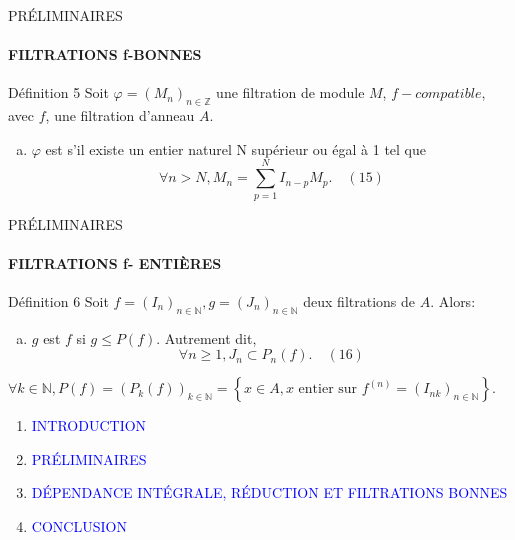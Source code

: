 \documentclass[11pt,a4paper]{beamer}
\begin{document}
	\begin{frame}{PRÉLIMINAIRES}
		\framesubtitle{FILTRATIONS f-BONNES}
		\begin{block}{Définition 5}
			Soit $\varphi=(M_n)_{n \in \mathbb{Z}}$ une filtration de module $M$, $f-compatible$, avec $f$, une filtration d'anneau $A$.
			\begin{enumerate}[(a)]
				\item $\varphi$ est  s'il existe un entier naturel N supérieur ou égal à 1 tel que
				\[\forall n > N, M_{n}=\sum_{p=1}^{N}I_{n-p}M_{p}. \quad (15)\]
			\end{enumerate}
		\end{block}
	\end{frame}
	
		\begin{frame}{PRÉLIMINAIRES}
		\framesubtitle{FILTRATIONS f- ENTIÈRES}
		\begin{block}{Définition 6}
			Soit $f=(I_n)_{n \in \mathbb{N}} , g = (J_n)_{n \in \mathbb{N}}$ deux filtrations de $A$.  Alors:\\
			\begin{enumerate}[(b)]
					\item $g$ est  $f$ si $g \leqslant P(f)$. Autrement dit,
				\[\forall n \geqslant 1, J_n \subset P_{n}(f). \quad (16) \]
			\end{enumerate}
			$\forall k \in \mathbb{N}, P(f)=(P_k(f))_{k \in \mathbb{N}} =\left\{x \in A, x \text{ entier sur } f^{(n)} = (I_{nk})_{n \in \mathbb{N}}\right\}.$
		\end{block}
	\end{frame}
	
			\begin{frame}
		\begin{enumerate}
			\item<0> \textcolor{blue}{INTRODUCTION}\\
			\item<0> \textcolor{blue}{PRÉLIMINAIRES}\\
			\item<1> \textcolor{blue}{DÉPENDANCE INTÉGRALE, RÉDUCTION ET FILTRATIONS BONNES }\\
			\item<0> \textcolor{blue}{CONCLUSION}\\
		\end{enumerate}
	\end{frame}
	
\end{document}
